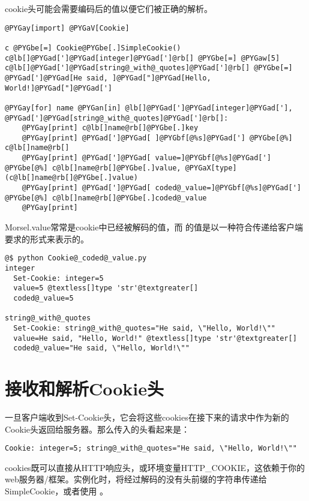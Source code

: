 \documentclass[a4paper,10pt,english]{manual}
\begin{document}
cookie头可能会需要编码后的值以便它们被正确的解析。

\begin{Verbatim}[commandchars=@\[\]]
@PYGay[import] @PYGaV[Cookie]

c @PYGbe[=] Cookie@PYGbe[.]SimpleCookie()
c@lb[]@PYGad[']@PYGad[integer]@PYGad[']@rb[] @PYGbe[=] @PYGaw[5]
c@lb[]@PYGad[']@PYGad[string@_with@_quotes]@PYGad[']@rb[] @PYGbe[=] @PYGad[']@PYGad[He said, ]@PYGad["]@PYGad[Hello, World!]@PYGad["]@PYGad[']

@PYGay[for] name @PYGan[in] @lb[]@PYGad[']@PYGad[integer]@PYGad['], @PYGad[']@PYGad[string@_with@_quotes]@PYGad[']@rb[]:
    @PYGay[print] c@lb[]name@rb[]@PYGbe[.]key
    @PYGay[print] @PYGad[']@PYGad[ ]@PYGbf[@%s]@PYGad['] @PYGbe[@%] c@lb[]name@rb[]
    @PYGay[print] @PYGad[']@PYGad[ value=]@PYGbf[@%s]@PYGad['] @PYGbe[@%] c@lb[]name@rb[]@PYGbe[.]value, @PYGaX[type](c@lb[]name@rb[]@PYGbe[.]value)
    @PYGay[print] @PYGad[']@PYGad[ coded@_value=]@PYGbf[@%s]@PYGad['] @PYGbe[@%] c@lb[]name@rb[]@PYGbe[.]coded@_value
    @PYGay[print]
\end{Verbatim}

Morsel.value常常是cookie中已经被解码的值，而  的值是以一种符合传递给客户端要求的形式来表示的。

\begin{Verbatim}[commandchars=@\[\]]
@$ python Cookie@_coded@_value.py
integer
  Set-Cookie: integer=5
  value=5 @textless[]type 'str'@textgreater[]
  coded@_value=5

string@_with@_quotes
  Set-Cookie: string@_with@_quotes="He said, \"Hello, World!\""
  value=He said, "Hello, World!" @textless[]type 'str'@textgreater[]
  coded@_value="He said, \"Hello, World!\""
\end{Verbatim}


\section{接收和解析Cookie头}

一旦客户端收到Set-Cookie头，它会将这些cookies在接下来的请求中作为新的Cookie头返回给服务器。那么传入的头看起来是：

\begin{Verbatim}[commandchars=@\[\]]
Cookie: integer=5; string@_with@_quotes="He said, \"Hello, World!\""
\end{Verbatim}

cookies既可以直接从HTTP响应头，或环境变量HTTP\_COOKIE，这依赖于你的web服务器/框架。实例化时，将经过解码的没有头前缀的字符串传递给SimpleCookie，或者使用  。
\end{document}

